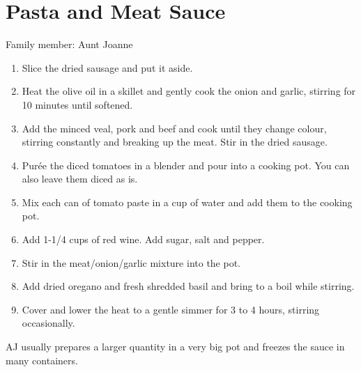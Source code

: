 \chapter{Pasta and Meat Sauce}
\label{ch:pastameatsauce}


Family member: Aunt Joanne

\begin{enumerate}
    \item Slice the dried sausage and put it aside.
    \item Heat the olive oil in a skillet and gently cook the onion and garlic, stirring for 10 minutes until softened.
    \item Add the minced veal, pork and beef and cook until they change colour, stirring constantly and breaking up the meat. Stir in the dried sausage.
    \item Purée the diced tomatoes in a blender and pour into a cooking pot. You can also leave them diced as is.
    \item Mix each can of tomato paste in a cup of water and add them to the cooking pot.
    \item Add 1-1/4 cups of red wine. Add sugar, salt and pepper.
    \item Stir in the meat/onion/garlic mixture into the pot.
    \item Add dried oregano and fresh shredded basil and bring to a boil while stirring.
    \item Cover and lower the heat to a gentle simmer for 3 to 4 hours, stirring occasionally.
\end{enumerate}

AJ usually prepares a larger quantity in a very big pot and freezes the sauce in many containers.
